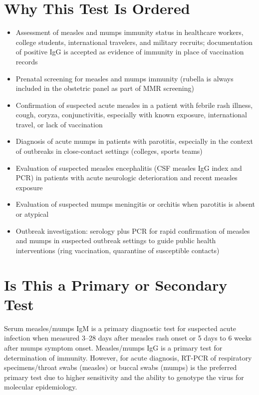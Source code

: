 \section*{Why This Test Is Ordered}
\begin{itemize}
  \item Assessment of measles and mumps immunity status in healthcare workers, college students, international travelers, and military recruits; documentation of positive IgG is accepted as evidence of immunity in place of vaccination records
  \item Prenatal screening for measles and mumps immunity (rubella is always included in the obstetric panel as part of MMR screening)
  \item Confirmation of suspected acute measles in a patient with febrile rash illness, cough, coryza, conjunctivitis, especially with known exposure, international travel, or lack of vaccination
  \item Diagnosis of acute mumps in patients with parotitis, especially in the context of outbreaks in close-contact settings (colleges, sports teams)
  \item Evaluation of suspected measles encephalitis (CSF measles IgG index and PCR) in patients with acute neurologic deterioration and recent measles exposure
  \item Evaluation of suspected mumps meningitis or orchitis when parotitis is absent or atypical
  \item Outbreak investigation: serology plus PCR for rapid confirmation of measles and mumps in suspected outbreak settings to guide public health interventions (ring vaccination, quarantine of susceptible contacts)
\end{itemize}

\section*{Is This a Primary or Secondary Test}
Serum measles/mumps IgM is a primary diagnostic test for suspected acute infection when measured 3--28 days after measles rash onset or 5 days to 6 weeks after mumps symptom onset. Measles/mumps IgG is a primary test for determination of immunity. However, for acute diagnosis, RT-PCR of respiratory specimens/throat swabs (measles) or buccal swabs (mumps) is the preferred primary test due to higher sensitivity and the ability to genotype the virus for molecular epidemiology.

